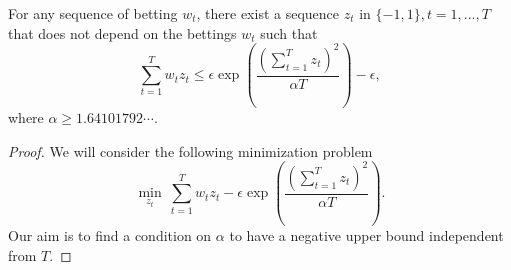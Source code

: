 \begin{theorem}
For any sequence of betting $w_t$, there exist a sequence $z_t$ in $\{-1,1\}, t=1,\ldots,T$ that does not depend on the bettings $w_t$ such that
\[
\sum_{t=1}^T w_t z_t \leq \epsilon \exp\left(\frac{(\sum_{t=1}^T z_t)^2}{\alpha T}\right) - \epsilon,
\]
where $\alpha \geq 1.64101792\cdots$.
\end{theorem}
\begin{proof}
We will consider the following minimization problem
\[
\min_{z_t} \ \sum_{t=1}^T w_t z_t - \epsilon \exp\left(\frac{(\sum_{t=1}^T z_t)^2}{\alpha T}\right).
\]
Our aim is to find a condition on $\alpha$ to have a negative upper bound independent from $T$.


\end{proof}
